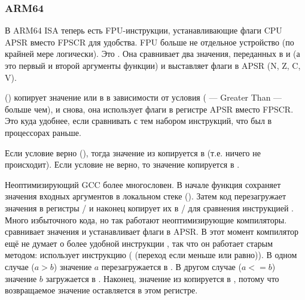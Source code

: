 \subsubsection{ARM64}




В ARM64 \ac{ISA} теперь есть FPU-инструкции, устанавливающие флаги CPU \ac{APSR} вместо \ac{FPSCR} для удобства.
\ac{FPU} больше не отдельное устройство (по крайней мере логически).
Это . Она сравнивает два значения, переданных в  и  
(а это первый и второй аргументы функции) и выставляет флаги в \ac{APSR} (N, Z, C, V).

 () копирует значение  или
 в  в зависимости от условия 
( --- Greater Than --- больше чем),
и снова, она использует флаги в регистре \ac{APSR} вместо \ac{FPSCR}.
Это куда удобнее, если сравнивать с тем набором инструкций, что был в процессорах раньше.

Если условие верно (), тогда значение из  копируется в  (т.е. ничего не происходит).
Если условие не верно, то значение  копируется в .




Неоптимизирующий GCC более многословен.
В начале функция сохраняет значения входных аргументов в локальном стеке ().
Затем код перезагружает значения в регистры
/ и наконец копирует их в 
/ для сравнения инструкцией . 
Много избыточного кода, но так работают неоптимизирующие компиляторы.
 сравнивает значения и устанавливает флаги в \ac{APSR}.
В этот момент компилятор ещё не думает о более удобной инструкции , так что он работает старым 
методом: 
использует инструкцию  ( (переход если меньше или равно)).
В одном случае ($a>b$) значение $a$ перезагружается в .
В другом случае ($a<=b$) значение $b$ загружается в .
Наконец, значение из  копируется в , 
потому что возвращаемое значение оставляется в этом регистре.

\mysubparagraph{\Exercise}

